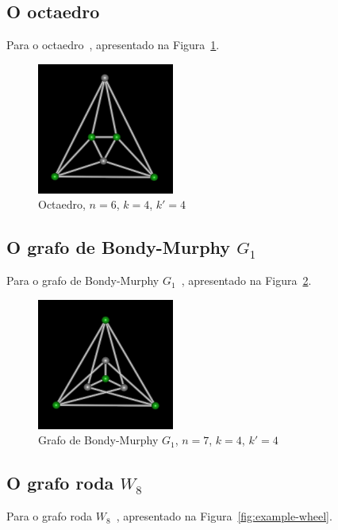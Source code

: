 \subsection{O octaedro}
Para o octaedro~\cite{cite:example-plato},
apresentado na Figura~\ref{fig:example-octaedro}.

\begin{figure}[htb]
\centering
\includegraphics[width=0.4\textwidth]{img/octaedro.png}
\caption{Octaedro, $n=6$, $k=4$, $k'=4$}
\label{fig:example-octaedro}
\end{figure}


\subsection{O grafo de Bondy-Murphy $G_1$}
Para o grafo de Bondy-Murphy $G_1$~\cite{cite:example-bondy},
apresentado na Figura~\ref{fig:example-bondymurphyg1}.

\begin{figure}[htb]
\centering
\includegraphics[width=0.4\textwidth]{img/bondymurphyg1.png}
\caption{Grafo de Bondy-Murphy $G_1$, $n=7$, $k=4$, $k'=4$}
\label{fig:example-bondymurphyg1}
\end{figure}


\subsection{O grafo roda $W_8$}
Para o grafo roda $W_8$~\cite{cite:example-bondy},
apresentado na Figura~\ref{fig:example-wheel}.


